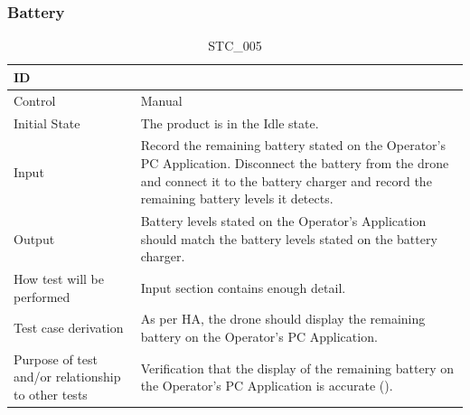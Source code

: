 \documentclass[12pt, titlepage]{article}
\begin{document}
\clearpage

\subsubsection{Battery}


\begin{table}[!h]
\begin{center}
\caption {STC\_005}
\label{tab:STC_005}
\begin{tabular}{ | m{3.2cm} | m{12.2cm} | } 
\hline
ID & \nameref{tab:STC_005} \\ 
\hline
Control & Manual \\ 
\hline
Initial State & The product is in the Idle state. \\ 
\hline
Input & Record the remaining battery stated on the Operator's PC Application. Disconnect the battery from the drone and connect it to the battery charger and record the remaining battery levels it detects. \\ 
\hline
Output & Battery levels stated on the Operator's Application should match the battery levels stated on the battery charger. \\ 
\hline
How test will be performed & Input section contains enough detail. \\ 
\hline
Test case derivation & As per HA, the drone should display the remaining battery on the Operator's PC Application. \\ 
\hline
Purpose of test and/or relationship to other tests & Verification that the display of the remaining battery on the Operator's PC Application is accurate (\nameref{SR_003}). \\ 
\hline
\end{tabular}
\end{center}
\end{table}
\end{document}
